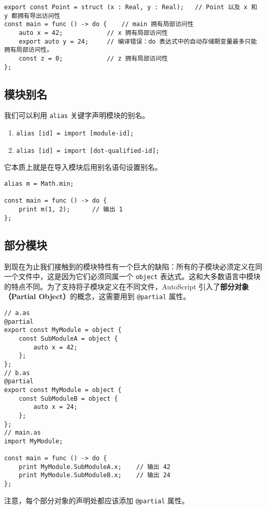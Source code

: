 \begin{lstlisting}
export const Point = struct (x : Real, y : Real);	// Point 以及 x 和 y 都拥有导出访问性
const main = func () -> do {	// main 拥有局部访问性
	auto x = 42;			// x 拥有局部访问性
	export auto y = 24;		// 编译错误：do 表达式中的自动存储期变量最多只能拥有局部访问性。
	const z = 0;			// z 拥有局部访问性
};
\end{lstlisting}

\subsection{模块别名}

我们可以利用 \lstinline!alias! 关键字声明模块的别名。

\begin{grammar}[模块别名] \label{grm:module-alias}
\begin{enumerate}
	\item \lstinline!alias [id] = import [module-id];!
	\item \lstinline!alias [id] = import [dot-qualified-id];!
\end{enumerate}
\end{grammar}

它本质上就是在导入模块后用别名语句设置别名。

\begin{lstlisting}
alias m = Math.min;

const main = func () -> do {
	print m(1, 2);		// 输出 1
};
\end{lstlisting}

\subsection{部分模块}

到现在为止我们接触到的模块特性有一个巨大的缺陷：所有的子模块必须定义在同一个文件中，这是因为它们必须同属一个 \lstinline!object! 表达式。这和大多数语言中模块的特点不同。为了支持将子模块定义在不同文件，AutoScript 引入了\textbf{部分对象（Partial Object）}的概念，这需要用到 \lstinline!@partial! 属性。

\begin{lstlisting}
// a.as
@partial
export const MyModule = object {
	const SubModuleA = object {
		auto x = 42;
	};
};
// b.as
@partial
export const MyModule = object {
	const SubModuleB = object {
		auto x = 24;
	};
};
// main.as
import MyModule;

const main = func () -> do {
	print MyModule.SubModuleA.x;	// 输出 42
	print MyModule.SubModuleB.x;	// 输出 24
};
\end{lstlisting}

注意，每个部分对象的声明处都应该添加 \lstinline!@partial! 属性。
